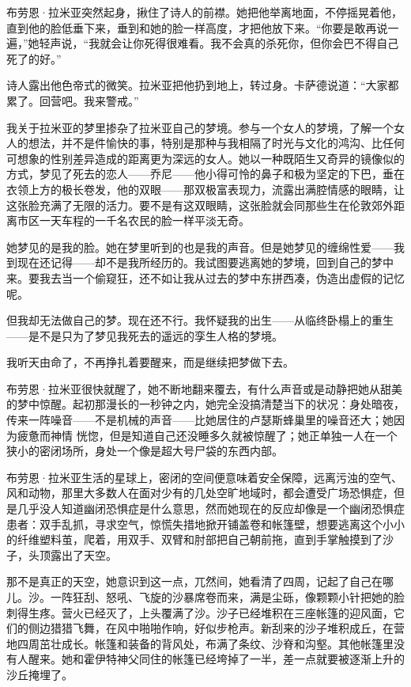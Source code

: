 \documentclass[AutoFakeBold=true]{book}
\begin{document}
布劳恩·拉米亚突然起身，揪住了诗人的前襟。她把他举离地面，不停摇晃着他，直到他的脸低垂下来，垂到和她的脸一样高度，才把他放下来。``你要是敢再说一遍，''她轻声说，``我就会让你死得很难看。我不会真的杀死你，但你会巴不得自己死了的好。''

诗人露出他色帝式的微笑。拉米亚把他扔到地上，转过身。卡萨德说道：``大家都累了。回营吧。我来警戒。''

我关于拉米亚的梦里掺杂了拉米亚自己的梦境。参与一个女人的梦境，了解一个女人的想法，并不是件愉快的事，特别是那种与我相隔了时光与文化的鸿沟、比任何可想象的性别差异造成的距离更为深远的女人。她以一种既陌生又奇异的镜像似的方式，梦见了死去的恋人——乔尼——他小得可怜的鼻子和极为坚定的下巴，垂在衣领上方的极长卷发，他的双眼——那双极富表现力，流露出满腔情感的眼睛，让这张脸充满了无限的活力。要不是有这双眼睛，这张脸就会同那些生在伦敦郊外距离市区一天车程的一千名农民的脸一样平淡无奇。

她梦见的是我的脸。她在梦里听到的也是我的声音。但是她梦见的缠绵性爱——我到现在还记得——却不是我所经历的。我试图要逃离她的梦境，回到自己的梦中来。要我去当一个偷窥狂，还不如让我从过去的梦中东拼西凑，伪造出虚假的记忆呢。

但我却无法做自己的梦。现在还不行。我怀疑我的出生——从临终卧榻上的重生——是不是只为了梦见我死去的遥远的孪生人格的梦境。

我听天由命了，不再挣扎着要醒来，而是继续把梦做下去。

\vspace*{1em}

布劳恩·拉米亚很快就醒了，她不断地翻来覆去，有什么声音或是动静把她从甜美的梦中惊醒。起初那漫长的一秒钟之内，她完全没搞清楚当下的状况：身处暗夜，传来一阵噪音——不是机械的声音——比她居住的卢瑟斯蜂巢里的噪音还大；她因为疲惫而神情 恍惚，但是知道自己还没睡多久就被惊醒了；她正单独一人在一个狭小的密闭场所，身处一个像是超大号尸袋的东西内部。

布劳恩·拉米亚生活的星球上，密闭的空间便意味着安全保障，远离污浊的空气、风和动物，那里大多数人在面对少有的几处空旷地域时，都会遭受广场恐惧症，但是几乎没人知道幽闭恐惧症是什么意思，然而她现在的反应却像是一个幽闭恐惧症患者：双手乱抓，寻求空气，惊慌失措地掀开铺盖卷和帐篷壁，想要逃离这个小小的纤维塑料茧，爬着，用双手、双臂和肘部把自己朝前拖，直到手掌触摸到了沙子，头顶露出了天空。

那不是真正的天空，她意识到这一点，兀然间，她看清了四周，记起了自己在哪儿。沙。一阵狂刮、怒吼、飞旋的沙暴席卷而来，满是尘砾，像颗颗小针把她的脸刺得生疼。营火已经灭了，上头覆满了沙。沙子已经堆积在三座帐篷的迎风面，它们的侧边猎猎飞舞，在风中啪啪作响，好似步枪声。新刮来的沙子堆积成丘，在营地四周茁壮成长。帐篷和装备的背风处，布满了条纹、沙脊和沟壑。其他帐篷里没有人醒来。她和霍伊特神父同住的帐篷已经垮掉了一半，差一点就要被逐渐上升的沙丘掩埋了。
\end{document}
